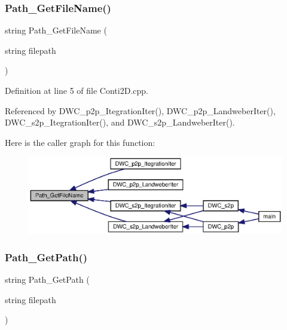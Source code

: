 \mbox{\label{Conti2D_8cpp_a88f10a86b8808047787d2df5e8cbcb72_a88f10a86b8808047787d2df5e8cbcb72}} 
\subsubsection{Path\+\_\+\+Get\+File\+Name()}
{\footnotesize\ttfamily string Path\+\_\+\+Get\+File\+Name (\begin{DoxyParamCaption}\item[{string}]{filepath }\end{DoxyParamCaption})}



Definition at line 5 of file Conti2\+D.\+cpp.



Referenced by D\+W\+C\+\_\+p2p\+\_\+\+Itegration\+Iter(), D\+W\+C\+\_\+p2p\+\_\+\+Landweber\+Iter(), D\+W\+C\+\_\+s2p\+\_\+\+Itegration\+Iter(), and D\+W\+C\+\_\+s2p\+\_\+\+Landweber\+Iter().

Here is the caller graph for this function\+:\nopagebreak
\begin{figure}[H]
\begin{center}
\leavevmode
\includegraphics[width=350pt]{Conti2D_8cpp_a88f10a86b8808047787d2df5e8cbcb72_a88f10a86b8808047787d2df5e8cbcb72_icgraph}
\end{center}
\end{figure}
\mbox{\label{Conti2D_8cpp_acb5dfc7e5499641f231021a61660b0b7_acb5dfc7e5499641f231021a61660b0b7}} 
\subsubsection{Path\+\_\+\+Get\+Path()}
{\footnotesize\ttfamily string Path\+\_\+\+Get\+Path (\begin{DoxyParamCaption}\item[{string}]{filepath }\end{DoxyParamCaption})}



